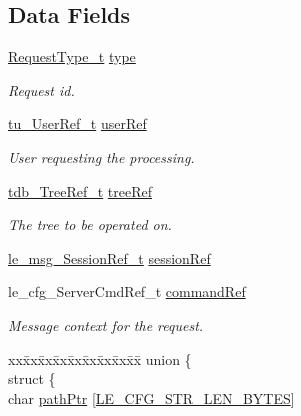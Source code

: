\subsection*{Data Fields}
\begin{DoxyCompactItemize}
\item 
\hyperlink{request_queue_8c_a8d105cd819d610a03c11892b3879f9fc}{Request\+Type\+\_\+t} \hyperlink{struct_update_request__t_a86b8158651e576979e082d212f18f272}{type}
\begin{DoxyCompactList}\small\item\em Request id. \end{DoxyCompactList}\item 
\hyperlink{tree_user_8h_ae16174a0d43f8a46e47447be76fe951a}{tu\+\_\+\+User\+Ref\+\_\+t} \hyperlink{struct_update_request__t_a236f18342e080cd70c17bee21a3023dc}{user\+Ref}
\begin{DoxyCompactList}\small\item\em User requesting the processing. \end{DoxyCompactList}\item 
\hyperlink{tree_db_8h_aa4d033a6e03f068d0e99455012b060c3}{tdb\+\_\+\+Tree\+Ref\+\_\+t} \hyperlink{struct_update_request__t_a90e1fbd86a484bb56b39bd844d0064d7}{tree\+Ref}
\begin{DoxyCompactList}\small\item\em The tree to be operated on. \end{DoxyCompactList}\item 
\hyperlink{le__messaging_8h_aebfc01e15b430a5b4f3038a5bd518904}{le\+\_\+msg\+\_\+\+Session\+Ref\+\_\+t} \hyperlink{struct_update_request__t_a8490e97a015cb059c423b27b415ce254}{session\+Ref}
\item 
le\+\_\+cfg\+\_\+\+Server\+Cmd\+Ref\+\_\+t \hyperlink{struct_update_request__t_a3567a0bf4b68648f11e7c37d3669377a}{command\+Ref}
\begin{DoxyCompactList}\small\item\em Message context for the request. \end{DoxyCompactList}\item 
\begin{tabbing}
xx\=xx\=xx\=xx\=xx\=xx\=xx\=xx\=xx\=\kill
union \{\\
\>struct \{\\
\>\>char \hyperlink{struct_update_request__t_ac9600d408f928f392b6acb3f03d88b56}{pathPtr} \mbox{[}\hyperlink{le__cfg__interface_8h_aea00ee500b7beccc4bf46ab637190a55}{LE\_CFG\_STR\_LEN\_BYTES}\mbox{]}\\

\end{tabbing}
\end{DoxyCompactItemize}
